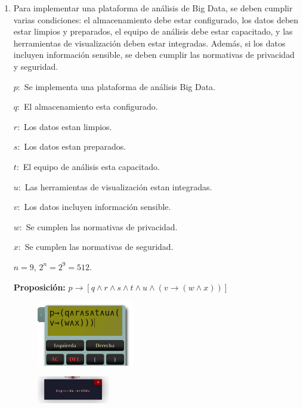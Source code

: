 \documentclass[12pt]{article}
\begin{document}
\begin{itemize}
\begin{enumerate}
                \newpage
                \item Para implementar una plataforma de análisis de Big Data, se deben cumplir varias condiciones: el almacenamiento debe estar configurado, los datos deben estar limpios y preparados, el equipo de análisis debe estar capacitado, y las herramientas de visualización deben estar integradas. Además, si los datos incluyen información sensible, se deben cumplir las normativas de privacidad y seguridad.
                    \par$p:$ Se implementa una plataforma de análisis Big Data.
                    \par$q:$ El almacenamiento esta configurado.
                    \par$r:$ Los datos estan limpios.
                    \par$s:$ Los datos estan preparados.
                    \par$t:$ El equipo de análisis esta capacitado.
                    \par$u:$ Las herramientas de visualización estan integradas.
                    \par$v:$ Los datos incluyen información sensible.
                    \par$w:$ Se cumplen las normativas de privacidad.
                    \par$x:$ Se cumplen las normativas de seguridad.
                    \par$n = 9$, $2^n = 2^9 = 512.$ \vspace{0.5cm}
                    \par\textbf{Proposición: }$p \longrightarrow [q \wedge r \wedge s \wedge t \wedge u \wedge (v \longrightarrow (w \wedge x))]$\vspace{0.5cm}

                    \begin{figure}[!h]
                        \centering
                        \includegraphics[width=0.4\textwidth]{Img/Tarea8_b_ej4_1.png}
                    \end{figure} \vspace{0.5cm}
                    \begin{figure}[!h]
                        \centering
                        \includegraphics[width=0.3\textwidth]{Img/Tarea8_b_ej4_2.png}
                    \end{figure} \vspace{0.5cm}


\end{enumerate}
\end{itemize}
\end{document}

